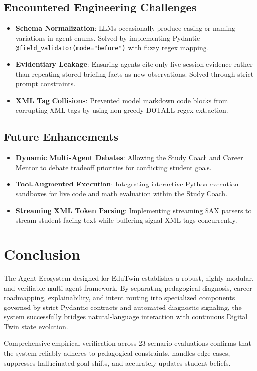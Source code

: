 \documentclass[12pt,a4paper]{article}
\begin{document}
\subsection{Encountered Engineering Challenges}
\begin{itemize}[noitemsep,topsep=2pt]
    \item \textbf{Schema Normalization}: LLMs occasionally produce casing or naming variations in agent enums. Solved by implementing Pydantic \texttt{@field\_validator(mode="before")} with fuzzy regex mapping.
    \item \textbf{Evidentiary Leakage}: Ensuring agents cite only live session evidence rather than repeating stored briefing facts as new observations. Solved through strict prompt constraints.
    \item \textbf{XML Tag Collisions}: Prevented model markdown code blocks from corrupting XML tags by using non-greedy DOTALL regex extraction.
\end{itemize}

\subsection{Future Enhancements}
\begin{itemize}[noitemsep,topsep=2pt]
    \item \textbf{Dynamic Multi-Agent Debates}: Allowing the Study Coach and Career Mentor to debate tradeoff priorities for conflicting student goals.
    \item \textbf{Tool-Augmented Execution}: Integrating interactive Python execution sandboxes for live code and math evaluation within the Study Coach.
    \item \textbf{Streaming XML Token Parsing}: Implementing streaming SAX parsers to stream student-facing text while buffering signal XML tags concurrently.
\end{itemize}

\section{Conclusion}
\label{sec:conclusion}

The Agent Ecosystem designed for EduTwin establishes a robust, highly modular, and verifiable multi-agent framework. By separating pedagogical diagnosis, career roadmapping, explainability, and intent routing into specialized components governed by strict Pydantic contracts and automated diagnostic signaling, the system successfully bridges natural-language interaction with continuous Digital Twin state evolution.

Comprehensive empirical verification across 23 scenario evaluations confirms that the system reliably adheres to pedagogical constraints, handles edge cases, suppresses hallucinated goal shifts, and accurately updates student beliefs.
\end{document}
